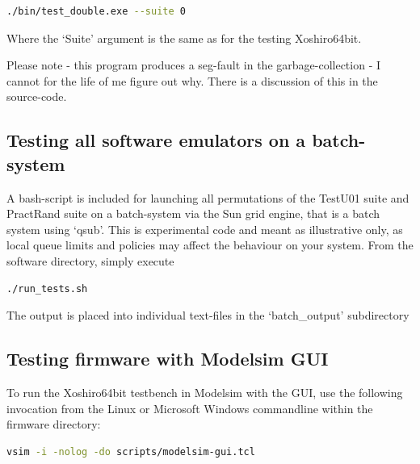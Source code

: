 \documentclass{article}
\begin{document}
\begin{minipage}{1.0\textwidth}
\centering
\begin{lstlisting}[language=bash, label=lst:SwTestU01Double]
./bin/test_double.exe --suite 0
\end{lstlisting}
\end{minipage}

Where the `Suite' argument is the same as for the testing Xoshiro64bit.

Please note - this program produces a seg-fault in the garbage-collection - I cannot for the life of me figure out why. There is a discussion of this in the source-code.

\subsection{Testing all software emulators on a batch-system}

A bash-script is included for launching all permutations of the TestU01 suite and PractRand suite on a batch-system via the Sun grid engine, that is a batch system using `qsub'. This is experimental code and meant as illustrative only, as local queue limits and policies may affect the behaviour on your system. From the software directory, simply execute

\begin{minipage}{1.0\textwidth}
\centering
\begin{lstlisting}[language=bash, label=lst:RunTestsSh]
./run_tests.sh
\end{lstlisting}
\end{minipage}

The output is placed into individual text-files in the `batch\_output' subdirectory

\subsection{Testing firmware with Modelsim GUI}

To run the Xoshiro64bit testbench in Modelsim with the GUI, use the following invocation from the Linux or Microsoft Windows commandline within the firmware directory:

\begin{minipage}{1.0\textwidth}
\centering
\begin{lstlisting}[language=bash , label=lst:ModelsimGui]
vsim -i -nolog -do scripts/modelsim-gui.tcl
\end{lstlisting}
\end{minipage}
\end{document}
